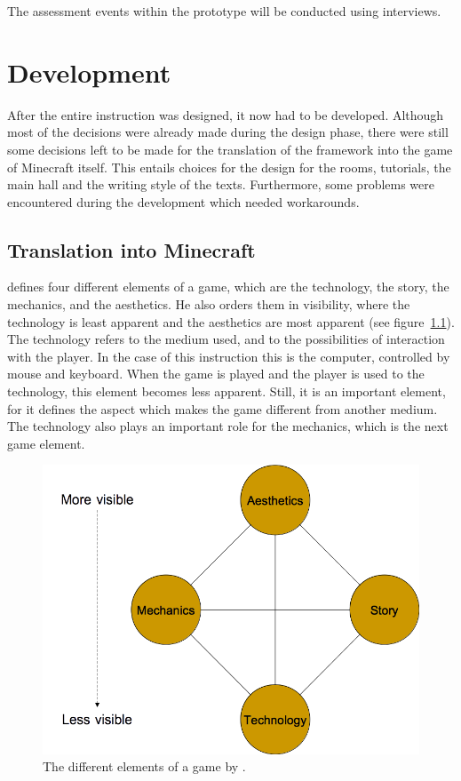 \documentclass[11pt,twoside]{report} %
\begin{document}
The assessment events within the prototype will be conducted using interviews.


\part{Development}
\thispagestyle{fancy}

After the entire instruction was designed, it now had to be developed. Although most of the decisions were already made during the design phase, there were still some decisions left to be made for the translation of the framework into the game of Minecraft itself. This entails choices for the design for the rooms, tutorials, the main hall and the writing style of the texts. Furthermore, some problems were encountered during the development which needed workarounds.

\chapter{Translation into Minecraft}

 defines four different elements of a game, which are the technology, the story, the mechanics, and the aesthetics. He also orders them in visibility, where the technology is least apparent and the aesthetics are most apparent (see figure~\ref{fig:game-elements}). The technology refers to the medium used, and to the possibilities of interaction with the player. In the case of this instruction this is the computer, controlled by mouse and keyboard. When the game is played and the player is used to the technology, this element becomes less apparent. Still, it is an important element, for it defines the aspect which makes the game different from another medium. The technology also plays an important role for the mechanics, which is the next game element.

\begin{figure}[h]
\centering
\includegraphics[width=.5\textwidth]{game-elements}
\caption{The different elements of a game by \protect{}.\label{fig:game-elements}}
\end{figure}
\end{document}
